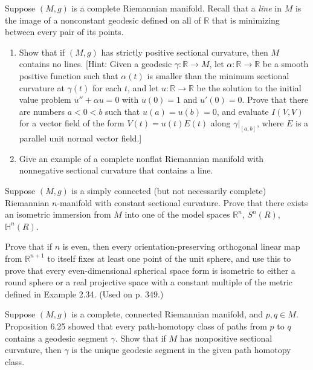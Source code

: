 \begin{exercise}\label{prob:complete-lines-sectional-curvature}
Suppose $(M, g)$ is a complete Riemannian manifold. Recall that a \emph{line} in $M$ is the image of a nonconstant geodesic defined on all of $\mathbb{R}$ that is minimizing between every pair of its points.

\begin{enumerate}[label=(\alph*)]
\item Show that if $(M, g)$ has strictly positive sectional curvature, then $M$ contains no lines. [Hint: Given a geodesic $\gamma : \mathbb{R} \to M$, let $\alpha : \mathbb{R} \to \mathbb{R}$ be a smooth positive function such that $\alpha(t)$ is smaller than the minimum sectional curvature at $\gamma(t)$ for each $t$, and let $u : \mathbb{R} \to \mathbb{R}$ be the solution to the initial value problem $u'' + \alpha u = 0$ with $u(0) = 1$ and $u'(0) = 0$. Prove that there are numbers $a < 0 < b$ such that $u(a) = u(b) = 0$, and evaluate $I(V, V)$ for a vector field of the form $V(t) = u(t)E(t)$ along $\gamma|_{[a,b]}$, where $E$ is a parallel unit normal vector field.]
\item Give an example of a complete nonflat Riemannian manifold with nonnegative sectional curvature that contains a line.
\end{enumerate}
\end{exercise}

\begin{exercise}
\label{prob:constant-sectional-curvature-immersion}
Suppose $(M, g)$ is a simply connected (but not necessarily complete) Riemannian $n$-manifold with constant sectional curvature. Prove that there exists an isometric immersion from $M$ into one of the model spaces $\mathbb{R}^n$, $S^n(R)$, $\mathbb{H}^n(R)$.
\end{exercise}

\begin{exercise}
\label{prob:fixed-points-orthogonal-map}
Prove that if $n$ is even, then every orientation-preserving orthogonal linear map from $\mathbb{R}^{n+1}$ to itself fixes at least one point of the unit sphere, and use this to prove that every even-dimensional spherical space form is isometric to either a round sphere or a real projective space with a constant multiple of the metric defined in Example 2.34. (Used on p. 349.)
\end{exercise}

\begin{exercise}
\label{prob:geodesic-uniqueness-nonpositive-curvature}
Suppose $(M,g)$ is a complete, connected Riemannian manifold, and $p,q \in M$. Proposition 6.25 showed that every path-homotopy class of paths from $p$ to $q$ contains a geodesic segment $\gamma$. Show that if $M$ has nonpositive sectional curvature, then $\gamma$ is the unique geodesic segment in the given path homotopy class.
\end{exercise}

